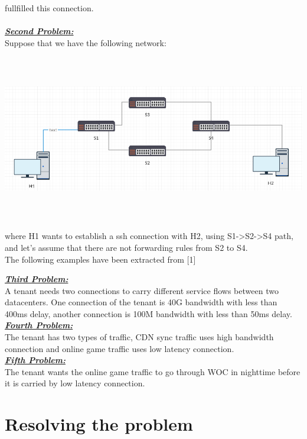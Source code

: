 \documentclass[envcountsect,runningheads]{llncs}
\begin{document}
fullfilled this connection. \\
\\
\textbf{\underline{\textit{Second Problem:}}} \\
Suppose that we have the following network:\\
\includegraphics[width=\textwidth, height=8cm]{second_example.png}\\
where H1 wants to establish a ssh connection with H2, using S1->S2->S4 path, and 
let's assume that there are not forwarding rules from S2 to S4. 
\\

The following examples have been extracted from [1]

\textbf{\underline{\textit{Third Problem:}}} \\
A tenant needs two connections to carry different service flows between two datacenters.
One connection of the tenant is 40G bandwidth with less than 400ms delay, another 
connection is 100M bandwidth with less than 50ms delay.\\

\textbf{\underline{\textit{Fourth Problem:}}} \\
The tenant has two types of traffic, CDN sync traffic uses high bandwidth connection and online 
game traffic uses low latency connection.\\

\textbf{\underline{\textit{Fifth Problem:}}} \\
The tenant wants the online game traffic to go through WOC in nighttime before it is carried by 
low latency connection.\\

\section{Resolving the problem}
\end{document}
